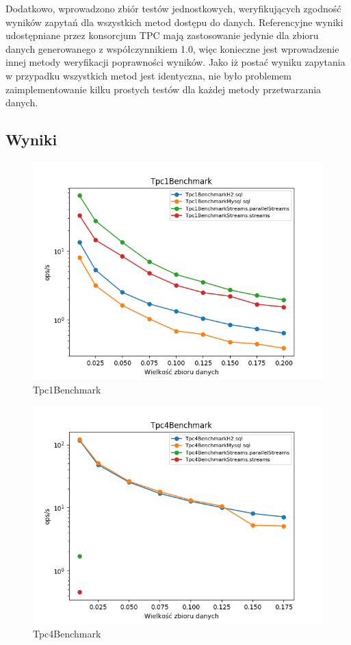 \documentclass[12pt]{extarticle}
\begin{document}
    Dodatkowo, wprowadzono zbiór testów jednostkowych, weryfikujących zgodność wyników zapytań dla wszystkich metod dostępu do danych. Referencyjne wyniki \cite{tpcresults} udostępniane przez konsorcjum TPC mają zastosowanie jedynie dla zbioru danych generowanego z współczynnikiem 1.0, więc konieczne jest wprowadzenie innej metody weryfikacji poprawności wyników. Jako iż postać wyniku zapytania w przypadku wszystkich metod jest identyczna, nie było problemem zaimplementowanie kilku prostych testów dla każdej metody przetwarzania danych.


\subsection{Wyniki}

\begin{figure}[H]
\centering
\includegraphics[width=15cm]{plots/Tpc1Benchmark}
\caption{Tpc1Benchmark}
\end{figure}

\begin{figure}[H]
\centering
\includegraphics[width=15cm]{plots/Tpc4Benchmark}
\caption{Tpc4Benchmark}
\end{figure}
\end{document}
